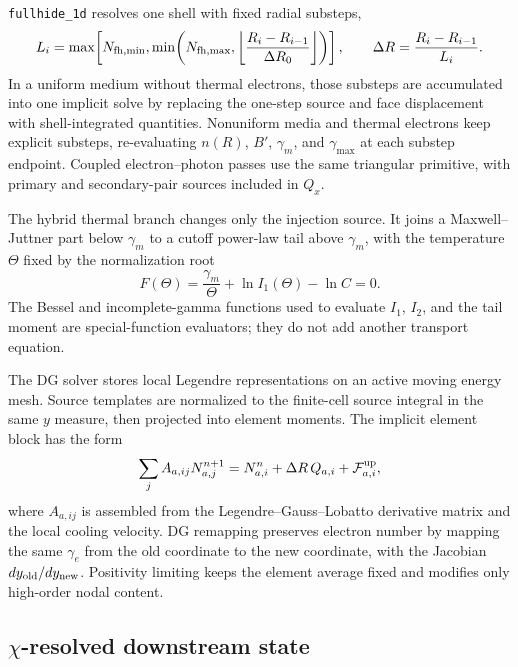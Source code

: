 \documentclass[twocolumn]{aastex702}
\begin{document}
\texttt{fullhide\_1d} resolves one shell with fixed radial substeps,
\begin{equation}
L_i=\max\!\left[N_{\rm fh,min},
\min\!\left(N_{\rm fh,max},
\left\lfloor\frac{R_i-R_{i-1}}{\Delta R_0}\right\rfloor\right)\right],
\qquad
\Delta R=\frac{R_i-R_{i-1}}{L_i}.
\end{equation}
In a uniform medium without thermal electrons, those substeps are accumulated
into one implicit solve by replacing the one-step source and face displacement
with shell-integrated quantities.  Nonuniform media and thermal electrons keep
explicit substeps, re-evaluating \(n(R)\), \(B'\), \(\gamma_m\), and
\(\gamma_{\max}\) at each substep endpoint.  Coupled electron--photon passes use
the same triangular primitive, with primary and secondary-pair sources included
in \(Q_x\).

The hybrid thermal branch changes only the injection source.  It joins a
Maxwell--Juttner part below \(\gamma_m\) to a cutoff power-law tail above
\(\gamma_m\), with the temperature \(\Theta\) fixed by the normalization root
\begin{equation}
F(\Theta)=\frac{\gamma_m}{\Theta}+\ln I_1(\Theta)-\ln C=0.
\end{equation}
The Bessel and incomplete-gamma functions used to evaluate \(I_1\), \(I_2\), and
the tail moment are special-function evaluators; they do not add another
transport equation.

The DG solver stores local Legendre representations on an active moving energy
mesh.  Source templates are normalized to the finite-cell source integral in the
same \(y\) measure, then projected into element moments.  The implicit element
block has the form
\begin{equation}
\sum_j A_{a,ij}N_{a,j}^{n+1}
=N_{a,i}^{n}+\Delta R\,Q_{a,i}
+\mathcal{F}_{a,i}^{\rm up},
\end{equation}
where \(A_{a,ij}\) is assembled from the Legendre--Gauss--Lobatto derivative
matrix and the local cooling velocity.  DG remapping preserves electron number
by mapping the same \(\gamma_e\) from the old coordinate to the new coordinate,
with the Jacobian \(dy_{\rm old}/dy_{\rm new}\).  Positivity limiting keeps the
element average fixed and modifies only high-order nodal content.

\subsection{\texorpdfstring{\(\chi\)}{chi}-resolved downstream state}
\end{document}
